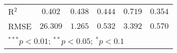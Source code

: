 \begin{table}
\begin{center}
\begin{tabular}{l c c c c c}
R$^{2}$                                                                          & $0.402$         & $0.438$                      & $0.444$        & $0.719$                       & $0.354$        \\
RMSE                                                                             & $26.309$        & $1.265$                      & $0.532$        & $3.392$                       & $0.570$        \\
\hline
\multicolumn{6}{l}{\scriptsize{$^{***}p<0.01$; $^{**}p<0.05$; $^{*}p<0.1$}}
\end{tabular}
\caption{}
\label{table:SI_table19_cw_het_A}
\end{center}
\end{table}
